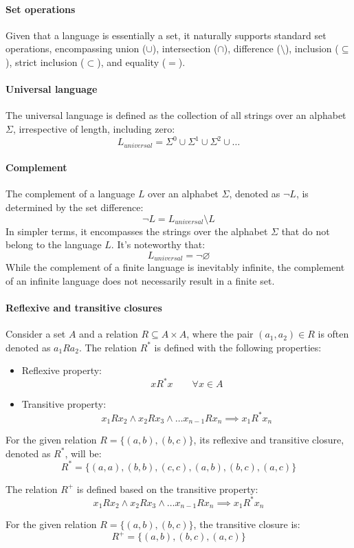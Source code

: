 \paragraph*{Set operations}  
Given that a language is essentially a set, it naturally supports standard set operations, encompassing union ($\cup$), intersection ($\cap$), difference ($ \setminus $), inclusion ($ \subseteq $), strict inclusion ($ \subset $), and equality ($=$). 

\paragraph*{Universal language} 
The universal language is defined as the collection of all strings over an alphabet $\Sigma$, irrespective of length, including zero:
\[L_{universal}=\Sigma ^0 \cup \Sigma ^1 \cup \Sigma ^2 \cup \dots \]

\paragraph*{Complement} 
The complement of a language $L$ over an alphabet $\Sigma$, denoted as $\lnot L$, is determined by the set difference:
\[\lnot L=L_{universal}\setminus L\]
In simpler terms, it encompasses the strings over the alphabet $\Sigma$ that do not belong to the language $L$.
It's noteworthy that:
\[L_{universal} = \lnot \varnothing\]
While the complement of a finite language is inevitably infinite, the complement of an infinite language does not necessarily result in a finite set.

\paragraph*{Reflexive and transitive closures} 
Consider a set $A$ and a relation $R \subseteq A \times A$, where the pair $(a_1, a_2) \in R$ is often denoted as $a_1Ra_2$.
The relation $R^{\ast}$ is defined with the following properties:
\begin{itemize}
    \item Reflexive property:
        \[xR^{\ast}x \qquad \forall x \in A\]
    \item Transitive property: 
        \[x_1Rx_2 \land x_2Rx_3 \land \dots x_{n-1}Rx_n \implies x_1R^{\ast}x_n\]
\end{itemize}
\begin{example}
    For the given relation $R = \{(a, b), (b, c)\}$, its reflexive and transitive closure, denoted as $R^{\ast}$, will be:
    \[R^{\ast} = \{(a, a), (b, b), (c, c), (a, b), (b, c), (a, c) \}\]
\end{example}
The relation $R^{+}$  is defined based on the transitive property:
\[x_1Rx_2 \land x_2Rx_3 \land \dots x_{n-1}Rx_n \implies x_1R^{\ast}x_n\]
\begin{example}
    For the given relation $R = \{(a, b), (b, c)\}$, the transitive closure is: 
    \[R^{+} = \{ (a, b), (b, c), (a, c)\}\]
\end{example}

